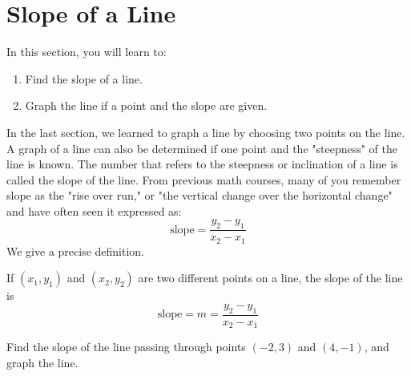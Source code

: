 \section{Slope of a Line}

In this section, you will learn to:
\begin{enumerate}
    \item Find the slope of a line.
    \item Graph the line if a point and the slope are given.
\end{enumerate}

In the last section, we learned to graph a line by choosing two points on the line. A graph of a line can also be determined if one point and the "steepness" of the line is known. The number that refers to the steepness or inclination of a line is called the slope of the line. From previous math courses, many of you remember slope as the "rise over run," or "the vertical change over the horizontal change" and have often seen it expressed as:
\[
\text{slope} = \frac{{y_2 - y_1}}{{x_2 - x_1}}
\]
We give a precise definition.

\begin{definition} If \((x_1, y_1)\) and \((x_2, y_2)\) are two different points on a line, the slope of the line is
\[
\text{slope} = m = \frac{{y_2 - y_1}}{{x_2 - x_1}}
\]
\end{definition}

\begin{example}\label{slope_example}
Find the slope of the line passing through points \((-2, 3)\) and \((4, -1)\), and graph the line.
\end{example}

